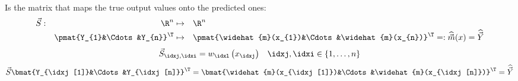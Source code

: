 \begin{defnbox}\nospacing
    \begin{defn}[\hfill\proofref{proof:defn:smoother_hat_matrix}\newline Smoother\bslash Hat Matrix\hfill\tcblack{$\widehat{\vec{Y}}=\vec{S}\vec{Y}$}]\label{defn:smoother_hat_matrix}\leavevmode\\
        Is the matrix that maps the true output values onto the predicted ones:
        \begin{alignat}{6}
          &\vec{S}:&\R^{n}&\mapsto&&\R^{n}\\[-1\jot]
          &&\pmat{Y_{1}&\Cdots&Y_{n}}^{\T}&\mapsto&&\pmat{\widehat{m}(x_{1})&\Cdots&\widehat{m}(x_{n})}^{\T}=:\widehat{\vec{m}}(x)=\widehat{\vec{Y}}
          \nonumber
        \end{alignat}
        \begin{align}
          \vec{S}_{\idxj,\idxi}=w_{\idxl} \left(x_{\idxj}\right)&&\idxj,\idxi\in \left\{1,\ldots,n\right\}
        \end{align}
        \begin{align}
          \vec{S} \bmat{Y_{\idxj[1]}&\Cdots&Y_{\idxj[n]}}^{\T}=\bmat{\widehat{m}(x_{\idxj[1]})&\Cdots&\widehat{m}(x_{\idxj[n]})}^{\T}=\widehat{\vec{Y}}
        \end{align}
    \end{defn}
\end{defnbox}
